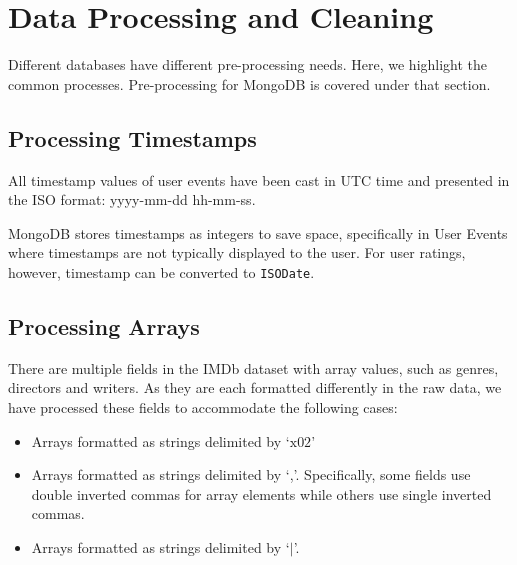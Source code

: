 \documentclass[10pt,titlepage]{article}
\begin{document}


\newpage
\section{Data Processing and Cleaning}
Different databases have different pre-processing needs. Here, we highlight the common processes. Pre-processing for
MongoDB is covered under that section.

\subsection{Processing Timestamps}
All timestamp values of user events have been cast in UTC time and presented in the ISO format: yyyy-mm-dd hh-mm-ss.

MongoDB stores timestamps as integers to save space, specifically in User Events where timestamps are not typically
displayed to the user. For user ratings, however, timestamp can be converted to \texttt{ISODate}.

\subsection{Processing Arrays}
There are multiple fields in the IMDb dataset with array values, such as genres, directors and writers. As they are each
formatted differently in the raw data, we have processed these fields to accommodate the following cases:

\begin{itemize}
  \item Arrays formatted as strings delimited by `$\mathrm{x}02$'

  \item Arrays formatted as strings delimited by `,'. Specifically, some fields use double inverted commas for array
      elements while others use single inverted commas.

  \item Arrays formatted as strings delimited by `$\mid$'.
\end{itemize}
\end{document}
